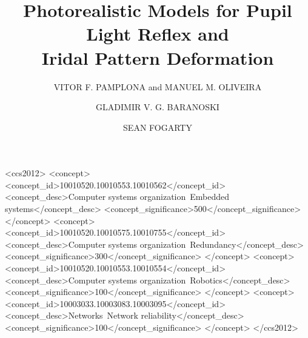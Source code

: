 \documentclass{acmtog} %
\begin{document}

\title{Photorealistic Models for Pupil Light Reflex and\\ Iridal Pattern Deformation} %

\author{VITOR F. PAMPLONA {\upshape and} MANUEL M. OLIVEIRA
\and
GLADIMIR V. G. BARANOSKI
\and
SEAN FOGARTY
}




%
%
\begin{CCSXML}
<ccs2012>
 <concept>
  <concept_id>10010520.10010553.10010562</concept_id>
  <concept_desc>Computer systems organization~Embedded systems</concept_desc>
  <concept_significance>500</concept_significance>
 </concept>
 <concept>
  <concept_id>10010520.10010575.10010755</concept_id>
  <concept_desc>Computer systems organization~Redundancy</concept_desc>
  <concept_significance>300</concept_significance>
 </concept>
 <concept>
  <concept_id>10010520.10010553.10010554</concept_id>
  <concept_desc>Computer systems organization~Robotics</concept_desc>
  <concept_significance>100</concept_significance>
 </concept>
 <concept>
  <concept_id>10003033.10003083.10003095</concept_id>
  <concept_desc>Networks~Network reliability</concept_desc>
  <concept_significance>100</concept_significance>
 </concept>
</ccs2012>  
\end{CCSXML}


%
%

\end{document}
